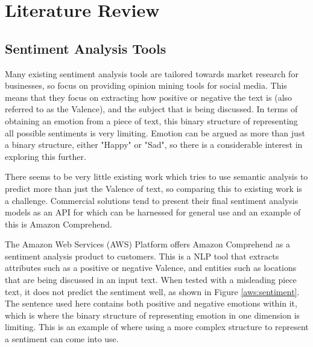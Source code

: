 
\section{Literature Review}
\subsection{Sentiment Analysis Tools}

Many existing sentiment analysis tools are tailored towards market research for businesses, so focus on providing opinion mining tools for social media. This means that they focus on extracting how positive or negative the text is (also referred to as the Valence), and the subject that is being discussed. In terms of obtaining an emotion from a piece of text, this binary structure of representing all possible sentiments is very limiting. Emotion can be argued as more than just a binary structure, either "Happy" or "Sad", so there is a considerable interest in exploring this further.

There seems to be very little existing work which tries to use semantic analysis to predict more than just the Valence of text, so comparing this to existing work is a challenge. Commercial solutions tend to present their final sentiment analysis models as an API for which can be harnessed for general use and an example of this is Amazon Comprehend.

The Amazon Web Services (AWS) Platform offers Amazon Comprehend \cite{aws} as a sentiment analysis product to customers. This is a NLP tool that extracts attributes such as a positive or negative Valence, and entities such as locations that are being discussed in an input text. When tested with a misleading piece text, it does not predict the sentiment well, as shown in Figure \ref{aws:sentiment}. The sentence used here contains both positive and negative emotions within it, which is where the binary structure of representing emotion in one dimension is limiting. This is an example of where using a more complex structure to represent a sentiment can come into use. 

